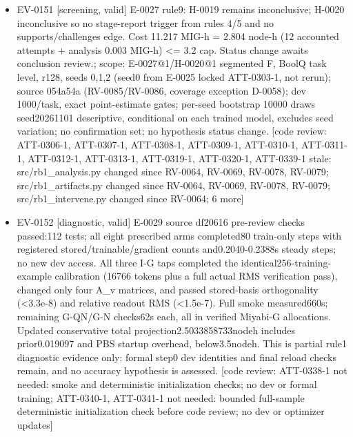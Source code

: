 \documentclass[11pt]{article}
\begin{document}
\begin{itemize}
\item EV-0151 [screening, valid] E-0027 rule9: H-0019 remains inconclusive; H-0020 inconclusive so no stage-report trigger from rules 4/5 and no supports/challenges edge. Cost 11.217 MIG-h = 2.804 node-h (12 accounted attempts + analysis 0.003 MIG-h) \textless{}= 3.2 cap. Status change awaits conclusion review.; scope: E-0027@1/H-0020@1 segmented F, BoolQ task level, r128, seeds 0,1,2 (seed0 from E-0025 locked ATT-0303-1, not rerun); source 054a54a (RV-0085/RV-0086, coverage exception D-0058); dev 1000/task, exact point-estimate gates; per-seed bootstrap 10000 draws seed20261101 descriptive, conditional on each trained model, excludes seed variation; no confirmation set; no hypothesis status change. [code review: ATT-0306-1, ATT-0307-1, ATT-0308-1, ATT-0309-1, ATT-0310-1, ATT-0311-1, ATT-0312-1, ATT-0313-1, ATT-0319-1, ATT-0320-1, ATT-0339-1 stale: src/rb1\_analysis.py changed since RV-0064, RV-0069, RV-0078, RV-0079; src/rb1\_artifacts.py changed since RV-0064, RV-0069, RV-0078, RV-0079; src/rb1\_intervene.py changed since RV-0064; 6 more]
\item EV-0152 [diagnostic, valid] E-0029 source df20616 pre-review checks passed:112 tests; all eight prescribed arms completed80 train-only steps with registered stored/trainable/gradient counts and0.2040-0.2388s steady steps; no new dev access. All three I-G taps completed the identical256-training-example calibration (16766 tokens plus a full actual RMS verification pass), changed only four A\_v matrices, and passed stored-basis orthogonality (\textless{}3.3e-8) and relative readout RMS (\textless{}1.5e-7). Full smoke measured660s; remaining G-QN/G-N checks62s each, all in verified Miyabi-G allocations. Updated conservative total projection2.5033858733nodeh includes prior0.019097 and PBS startup overhead, below3.5nodeh. This is partial rule1 diagnostic evidence only: formal step0 dev identities and final reload checks remain, and no accuracy hypothesis is assessed. [code review: ATT-0338-1 not needed: smoke and deterministic initialization checks; no dev or formal training; ATT-0340-1, ATT-0341-1 not needed: bounded full-sample deterministic initialization check before code review; no dev or optimizer updates]

\end{itemize}
\end{document}
